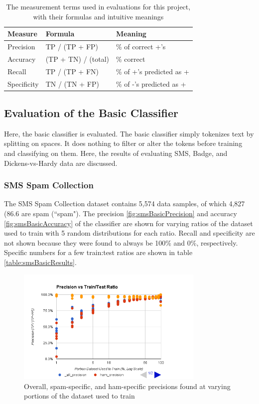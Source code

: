 \begin{table}
    \begin{tabular}{lll}
        \hline
        \textbf{Measure} & \textbf{Formula} & \textbf{Meaning} \\ [0.5ex]
        \hline\hline
        Precision	& TP / (TP + FP) & \% of correct +'s \\
        Accuracy	& (TP + TN) / (total) & \% correct \\
        Recall 	    & TP / (TP + FN) & \% of +'s predicted as + \\
        Specificity	& TN / (TN + FP) & \% of -'s predicted as + \\
        \hline
    \end{tabular}
    \caption{The measurement terms used in evaluations for this project, with their formulas and intuitive meanings}
    \label{table:measures}
\end{table}

\subsection{Evaluation of the Basic Classifier}
\label{subsection:basicResults}
Here, the basic classifier is evaluated. The basic classifier simply tokenizes text by splitting on spaces. It does
nothing to filter or alter the tokens before training and classifying on them. Here, the results of evaluating SMS,
Badge, and Dickens-vs-Hardy data are discussed.

\subsubsection{SMS Spam Collection}
\label{subsection:smsBasic}
The SMS Spam Collection dataset contains 5,574 data samples, of which 4,827 (86.6%
are spam (``spam"). The precision \ref{fig:smsBasicPrecision} and accuracy \ref{fig:smsBasicAccuracy} of the classifier
are shown for varying ratios of the dataset used to train with 5 random distributions for each ratio. Recall and
specificity are not shown because they were found to always be 100\% and 0\%, respectively. Specific numbers
for a few train:test ratios are shown in table \ref{table:smsBasicResults}.

\begin{figure}[ht!]
    \centering
    \includegraphics[width=90mm]{img/sms_basic-precision.png}
    \caption{Overall, spam-specific, and ham-specific precisions found at varying portions of the dataset used to train}
    \label{fig:spamBasicPrecision}
\end{figure}


